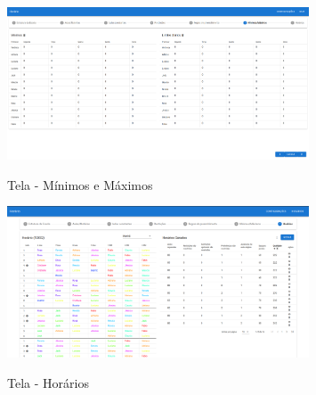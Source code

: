 \begin{figure}[h]
	\centering
	\caption{Tela - Mínimos e Máximos}
	\includegraphics[width=0.8\textwidth]{./dados/figuras/tela_minimos_maximos}
	\label{fig:tela-minimos-maximos}
\end{figure}

\begin{figure}[h]
	\centering
	\caption{Tela - Horários}
	\includegraphics[width=0.8\textwidth]{./dados/figuras/tela_horarios}
	\label{fig:tela-horarios}
\end{figure}